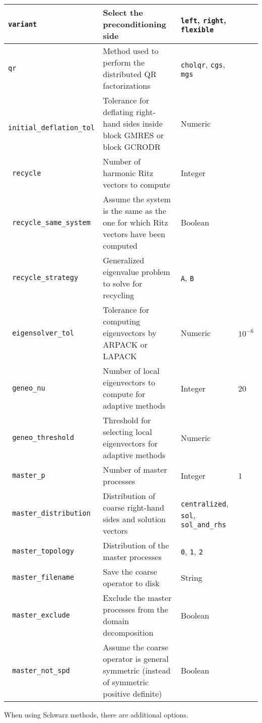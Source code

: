 \documentclass{article}
\begin{document}
\begin{center}
\begin{longtable}{| >{\tt}p{} | p{}| p{}| p{} |}
        variant & Select the preconditioning side & \texttt{left}, \texttt{right}, \texttt{flexible} & \\ \hline
        qr & Method used to perform the distributed QR factorizations & \texttt{cholqr}, \texttt{cgs}, \texttt{mgs} & \\ \hline
        initial\_deflation\_tol & Tolerance for deflating right-hand sides inside block GMRES or block GCRODR & Numeric & \\ \hline
        recycle & Number of harmonic Ritz vectors to compute & Integer & \\ \hline
        recycle\_same\_system & Assume the system is the same as the one for which Ritz vectors have been computed & Boolean & \\ \hline
        recycle\_strategy & Generalized eigenvalue problem to solve for recycling & \texttt{A}, \texttt{B} & \\ \hline
        \rowcolor{LightRed}eigensolver\_tol & Tolerance for computing eigenvectors by ARPACK or LAPACK & Numeric & $10^{-6}$ \\ \hline
        geneo\_nu & Number of local eigenvectors to compute for adaptive methods & Integer & 20 \\ \hline
        \rowcolor{LightRed}geneo\_threshold & Threshold for selecting local eigenvectors for adaptive methods & Numeric & \\ \hline
        master\_p & Number of master processes & Integer & 1 \\ \hline
        \rowcolor{LightRed}master\_distribution & Distribution of coarse right-hand sides and solution vectors & \texttt{centralized}, \texttt{sol}, \texttt{sol\_and\_rhs} & \\ \hline
        \rowcolor{LightRed}master\_topology & Distribution of the master processes & \texttt{0}, \texttt{1}, \texttt{2} & \\ \hline
        master\_filename & Save the coarse operator to disk & String & \\ \hline
        \rowcolor{LightRed}master\_exclude & Exclude the master processes from the domain decomposition & Boolean & \\ \hline
        master\_not\_spd & Assume the coarse operator is general symmetric (instead of symmetric positive definite) & Boolean & \\ \hline
    \end{longtable}
\vspace*{-0.4cm}
\end{center}
When using Schwarz methods, there are additional options.
\end{document}
